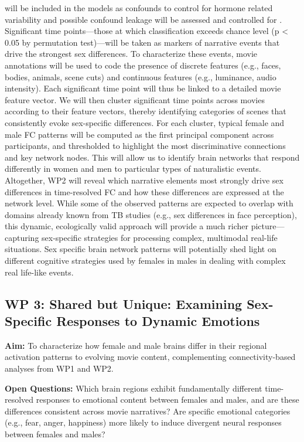 \documentclass[11pt,a4paper]{article}
\begin{document}
will be included in the models as confounds to control for hormone related variability and possible confound
leakage will be assessed and controlled for \parencite{hamdanConfoundleakageConfoundRemoval2022a}.\\
Significant time points—those at which classification exceeds chance level (p < 0.05 by permutation test)—will be 
taken as markers of narrative events that drive the strongest sex differences. 
To characterize these events, movie annotations will be used to code the presence of discrete features 
(e.g., faces, bodies, animals, scene cuts) and continuous features (e.g., luminance, audio intensity). 
Each significant time point will thus be linked to a detailed movie feature vector.  
We will then cluster significant time points across movies according to their feature vectors, 
thereby identifying categories of scenes that consistently evoke sex-specific differences. 
For each cluster, typical female and male FC patterns will be computed as the first principal component 
across participants, and thresholded to highlight the most discriminative connections and key network nodes. 
This will allow us to identify brain networks that respond differently in women and men to particular 
types of naturalistic events.\\
Altogether, WP2 will reveal which narrative elements most strongly drive sex differences in time-resolved 
FC and how these differences are expressed at the network level. 
While some of the observed patterns are expected to overlap with domains already known from TB studies 
(e.g., sex differences in face perception), this dynamic, ecologically valid approach will provide a 
much richer picture—capturing sex-specific strategies for processing complex, multimodal real-life situations.
Sex specific brain network patterns will potentially shed light on different cognitive strategies used by
females in males in dealing with complex real life-like events.   

\subsection*{WP 3: Shared but Unique: Examining Sex-Specific Responses to Dynamic Emotions}

\textbf{Aim:} To characterize how female and male brains differ in their regional activation patterns 
to evolving movie content, complementing connectivity-based analyses from WP1 and WP2.  

\textbf{Open Questions:} Which brain regions exhibit fundamentally different time-resolved responses 
to emotional content between females and males, and are these differences consistent across movie narratives? 
Are specific emotional categories (e.g., fear, anger, happiness) more likely to induce divergent neural responses between females and males?  
\end{document}
